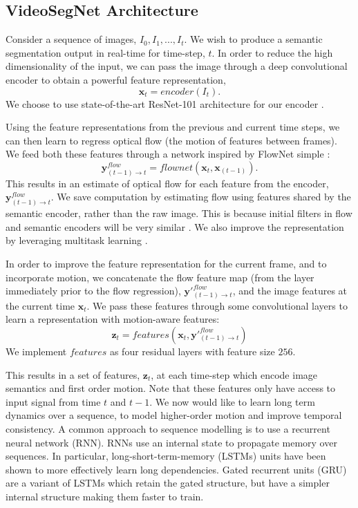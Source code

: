 \subsection{VideoSegNet Architecture}
\label{sec:architecture}

Consider a sequence of images, $I_0, I_1, ... , I_t$. We wish to produce a semantic segmentation output in real-time for time-step, $t$.
In order to reduce the high dimensionality of the input, we can pass the image through a deep convolutional encoder to obtain a powerful feature representation,
\begin{equation}
\mathbf{x}_t = encoder(I_t).
\end{equation}
We choose to use state-of-the-art ResNet-101 architecture for our encoder \citep{he2016deep}.

Using the feature representations from the previous and current time steps, we can then learn to regress optical flow (the motion of features between frames). We feed both these features through a network inspired by FlowNet simple \citep{dosovitskiy2015flownet}:
\begin{equation}
\mathbf{y}^{flow}_{(t-1) \to t} = flownet(\mathbf{x}_t, \mathbf{x}_{(t-1)}).
\end{equation}
This results in an estimate of optical flow for each feature from the encoder, $\mathbf{y}^{flow}_{(t-1) \to t} $. We save computation by estimating flow using features shared by the semantic encoder, rather than the raw image. This is because initial filters in flow and semantic encoders will be very similar \citep{zeiler2014visualizing}. We also improve the representation by leveraging multitask learning \citep{caruana1998multitask}.

In order to improve the feature representation for the current frame, and to incorporate motion, we concatenate the flow feature map (from the layer immediately prior to the flow regression), $\mathbf{y}'^{flow}_{(t-1) \to t}$, and the image features at the current time $\mathbf{x}_t$. We pass these features through some convolutional layers to learn a representation with motion-aware features:
\begin{equation}
\mathbf{z}_t = features(\mathbf{x}_t, \mathbf{y}'^{flow}_{(t-1) \to t})
\end{equation}
We implement $features$ as four residual layers \citep{he2016deep} with feature size $256$.

This results in a set of features, $\mathbf{z}_t$, at each time-step which encode image semantics and first order motion. Note that these features only have access to input signal from time $t$ and $t-1$. We now would like to learn long term dynamics over a sequence, to model higher-order motion and improve temporal consistency. A common approach to sequence modelling is to use a recurrent neural network (RNN). RNNs use an internal state to propagate memory over sequences. In particular, long-short-term-memory (LSTMs) units \citep{hochreiter1997long} have been shown to more effectively learn long dependencies. Gated recurrent units (GRU) \citep{cho2014learning} are a variant of LSTMs which retain the gated structure, but have a simpler internal structure making them faster to train.

